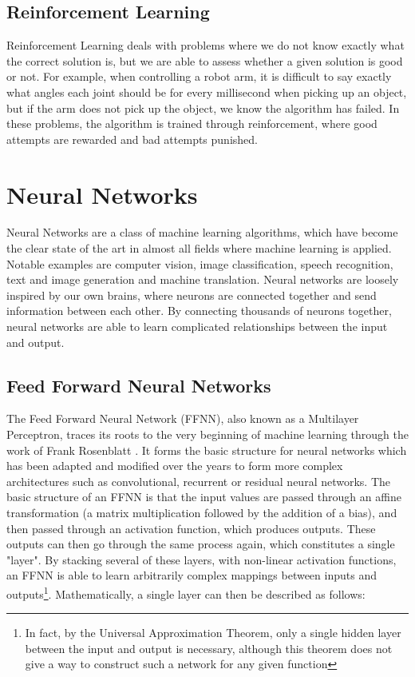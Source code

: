 \documentclass[UKenglish]{uiomasterthesis} %
\theoremstyle{definition}
\begin{document}
\subsection{Reinforcement Learning}

Reinforcement Learning deals with problems where we do not know exactly what the correct solution is, but we are able to assess whether a given solution is good or not. For example, when controlling a robot arm, it is difficult to say exactly what angles each joint should be for every millisecond when picking up an object, but if the arm does not pick up the object, we know the algorithm has failed. In these problems, the algorithm is trained through reinforcement, where good attempts are rewarded and bad attempts punished.

\section{Neural Networks}

Neural Networks are a class of machine learning algorithms, which have become the clear state of the art in almost all fields where machine learning is applied. Notable examples are computer vision, image classification, speech recognition, text and image generation and machine translation. Neural networks are loosely inspired by our own brains, where neurons are connected together and send information between each other. By connecting thousands of neurons together, neural networks are able to learn complicated relationships between the input and output.

\subsection{Feed Forward Neural Networks}

The Feed Forward Neural Network (FFNN), also known as a Multilayer Perceptron, traces its roots to the very beginning of machine learning through the work of Frank Rosenblatt \cite{rosenblatt}. It forms the basic structure for neural networks which has been adapted and modified over the years to form more complex architectures such as convolutional, recurrent or residual neural networks. The basic structure of an FFNN is that the input values are passed through an affine transformation (a matrix multiplication followed by the addition of a bias), and then passed through an activation function, which produces outputs. These outputs can then go through the same process again, which constitutes a single "layer". By stacking several of these layers, with non-linear activation functions, an FFNN is able to learn arbitrarily complex mappings between inputs and outputs\footnote{In fact, by the Universal Approximation Theorem, only a single hidden layer between the input and output is necessary, although this theorem does not give a way to construct such a network for any given function}. Mathematically, a single layer can then be described as follows:
\end{document}

